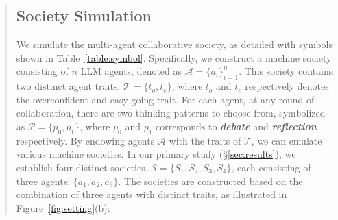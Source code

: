 \documentclass[11pt]{article}
\begin{document}
\begin{abstract}
\subsection{Society Simulation}
\label{sec:simulation}



We simulate the multi-agent collaborative society, as detailed with symbols shown in Table~\ref{table:symbol}. 
Specifically, we construct a machine society consisting of $n$ LLM agents, denoted as $\mathcal{A}=\{a_i\}_{i=1}^n$. This society contains two distinct agent traits: $\mathcal{T}=\{t_o, t_e\}$, where $t_o$ and $t_e$ respectively denotes the overconfident and easy-going trait. 
For each agent, at any round of collaboration, there are two thinking patterns to choose from, symbolized as $\mathcal{P}=\{p_0, p_1\}$, where $p_0$ and $p_1$ corresponds to \textbf{\textit{debate}} and \textbf{\textit{reflection}} respectively. 
By endowing agents $\mathcal{A}$ with the traits of $\mathcal{T}$, we can emulate various machine societies. 
In our primary study (\S\ref{sec:results}), we establish four distinct societies, $\mathcal{S}=\{S_1, S_2, S_3, S_4\}$, each consisting of three agents: $\{a_1, a_2, a_3\}$. The societies are constructed based on the combination of three agents with distinct traits, as illustrated in Figure~\ref{fig:setting}(b): 


\end{abstract}
\end{document}
